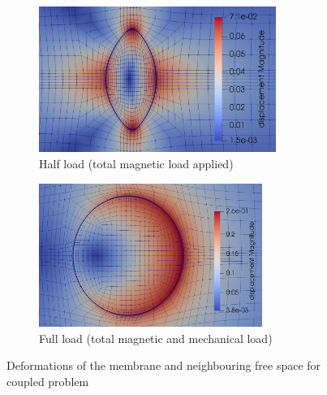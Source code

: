 \documentclass[11pt,a4paper,final]{article}
\begin{document}
\begin{figure}[h]
\centering
\begin{subfigure}{0.48\textwidth}
\centering
\includegraphics[width=0.85\textwidth]{coup_membrane_ls_50_disp.png}
\caption{Half load (total magnetic load applied)}
\label{fig:3.11.1}
\end{subfigure}
\begin{subfigure}{0.48\textwidth}
\centering
\includegraphics[width=0.8\textwidth]{coup_membrane_ls_100_disp.png}
\caption{Full load (total magnetic and mechanical load)}
\label{fig:3.11.2}
\end{subfigure}
\caption{Deformations of the membrane and neighbouring free space for coupled problem}
\label{fig:3.11}
\end{figure}
\end{document}
